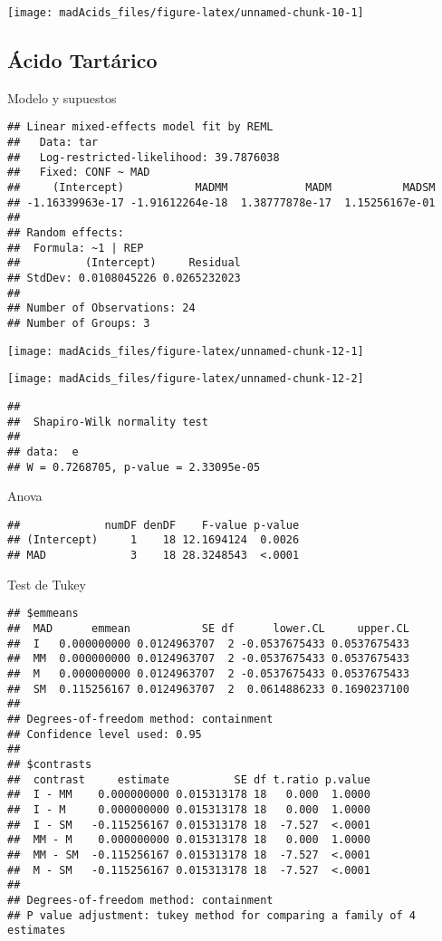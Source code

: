 \documentclass[
]{article}
\begin{document}
\begin{center}\texttt{[image: madAcids\_files/figure-latex/unnamed-chunk-10-1]} \end{center}

\subsection{Ácido Tartárico}\label{uxe1cido-tartuxe1rico}

Modelo y supuestos

\begin{verbatim}
## Linear mixed-effects model fit by REML
##   Data: tar 
##   Log-restricted-likelihood: 39.7876038
##   Fixed: CONF ~ MAD 
##     (Intercept)           MADMM            MADM           MADSM 
## -1.16339963e-17 -1.91612264e-18  1.38777878e-17  1.15256167e-01 
## 
## Random effects:
##  Formula: ~1 | REP
##          (Intercept)     Residual
## StdDev: 0.0108045226 0.0265232023
## 
## Number of Observations: 24
## Number of Groups: 3
\end{verbatim}

\begin{center}\texttt{[image: madAcids\_files/figure-latex/unnamed-chunk-12-1]} \end{center}

\begin{center}\texttt{[image: madAcids\_files/figure-latex/unnamed-chunk-12-2]} \end{center}

\begin{verbatim}
## 
##  Shapiro-Wilk normality test
## 
## data:  e
## W = 0.7268705, p-value = 2.33095e-05
\end{verbatim}

Anova

\begin{verbatim}
##             numDF denDF    F-value p-value
## (Intercept)     1    18 12.1694124  0.0026
## MAD             3    18 28.3248543  <.0001
\end{verbatim}

Test de Tukey

\begin{verbatim}
## $emmeans
##  MAD      emmean           SE df      lower.CL     upper.CL
##  I   0.000000000 0.0124963707  2 -0.0537675433 0.0537675433
##  MM  0.000000000 0.0124963707  2 -0.0537675433 0.0537675433
##  M   0.000000000 0.0124963707  2 -0.0537675433 0.0537675433
##  SM  0.115256167 0.0124963707  2  0.0614886233 0.1690237100
## 
## Degrees-of-freedom method: containment 
## Confidence level used: 0.95 
## 
## $contrasts
##  contrast     estimate          SE df t.ratio p.value
##  I - MM    0.000000000 0.015313178 18   0.000  1.0000
##  I - M     0.000000000 0.015313178 18   0.000  1.0000
##  I - SM   -0.115256167 0.015313178 18  -7.527  <.0001
##  MM - M    0.000000000 0.015313178 18   0.000  1.0000
##  MM - SM  -0.115256167 0.015313178 18  -7.527  <.0001
##  M - SM   -0.115256167 0.015313178 18  -7.527  <.0001
## 
## Degrees-of-freedom method: containment 
## P value adjustment: tukey method for comparing a family of 4 estimates
\end{verbatim}
\end{document}
